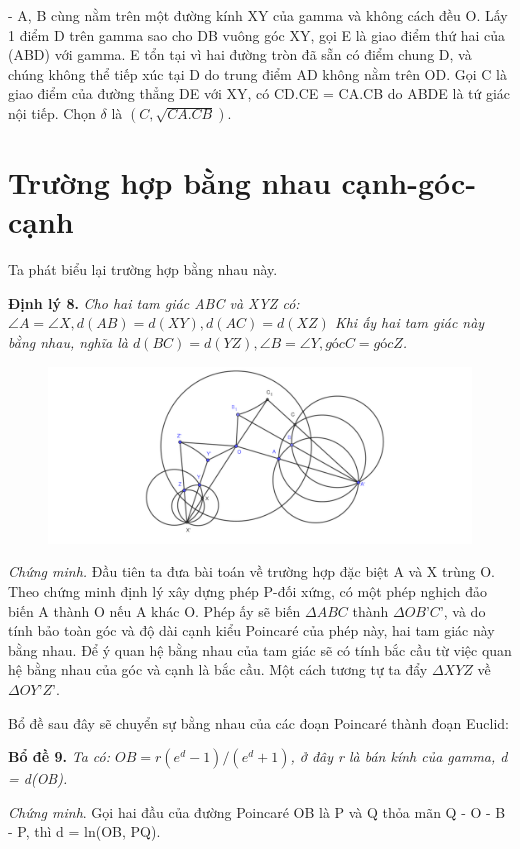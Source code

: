 - A, B cùng nằm trên một đường kính XY của gamma và không cách đều O. Lấy 1 điểm D trên gamma sao cho DB vuông góc XY, gọi E là giao điểm thứ hai của (ABD) với gamma. E tổn tại vì hai đường tròn đã sẵn có điểm chung D, và chúng không thể tiếp xúc tại D do trung điểm AD không nằm trên OD. Gọi C là giao điểm của đường thẳng DE với XY, có CD.CE = CA.CB do ABDE là tứ giác nội tiếp. Chọn $\delta$ là $(C, \sqrt{CA.CB})$.

\section{Trường hợp bằng nhau cạnh-góc-cạnh}

Ta phát biểu lại trường hợp bằng nhau này.

\textbf{Định lý 8.}\textit{
Cho hai tam giác ABC và XYZ có: $ \angle A = \angle X, d(AB) = d(XY), d(AC) = d(XZ)$
Khi ấy hai tam giác này bằng nhau, nghĩa là $d(BC)  = d(YZ), \angle B = \angle Y, góc C = góc Z$.
}
\begin{figure}[ht]
\includegraphics[width=\textwidth]{TH_cgc.pdf}
\end{figure}


\textit{Chứng minh.} Đầu tiên ta đưa bài toán về trường hợp đặc biệt A và X trùng O.
Theo chứng minh định lý xây dựng phép P-đối xứng, có một phép nghịch đảo biến A thành O nếu A khác O. Phép ấy sẽ biến $\Delta ABC$ thành $\Delta OB’C’$, và do tính bảo toàn góc và độ dài cạnh kiểu Poincar\'e của phép này, hai tam giác này bằng nhau. Để ý quan hệ bằng nhau của tam giác sẽ có tính bắc cầu từ việc quan hệ bằng nhau của góc và cạnh là bắc cầu. Một cách tương tự ta đẩy $\Delta XYZ$ về $ \Delta OY’Z’$.

Bổ đề sau đây sẽ chuyển sự bằng nhau của các đoạn Poincar\'e thành đoạn Euclid:

\textbf{Bổ đề 9.} \textit{Ta có: $OB =  r(e^d -1)/(e^d+1)$, ở đây r là bán kính của gamma, d = d(OB).}

\textit{Chứng minh}. Gọi hai đầu của đường Poincar\'e  OB là P và Q thỏa mãn 
Q - O - B - P, thì d = ln(OB, PQ).

